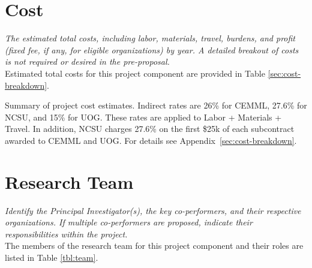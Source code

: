 \documentclass[11pt,english,letterpaper]{scrartcl}
\begin{document}

\section{Cost}

\textit{The estimated total costs, including labor, materials, travel, burdens, and profit	(fixed fee, if any, for eligible organizations) by year. A detailed breakout of costs is not	required or desired in the pre-proposal.}\\

Estimated total costs for this project component are provided in Table \ref{sec:cost-breakdown}.

\begin{table}[h]
	\centering
	\caption{Summary of project cost estimates.
		Indirect rates are 26\% for CEMML, 27.6\% for NCSU, and 15\% for UOG.
		These rates are applied to Labor + Materials + Travel.
		In addition, NCSU charges 27.6\% on the first \$25k of each subcontract awarded to CEMML and UOG. For details see Appendix~\ref{sec:cost-breakdown}.}	
%	
	\label{tbl:cost}
\end{table}

\section{Research Team}

\textit{Identify the Principal Investigator(s), the key co-performers, and their respective organizations. If multiple co-performers are proposed, indicate their responsibilities within the project.}\\

The members of the research team for this project component and their roles are listed in Table \ref{tbl:team}.
\end{document}
